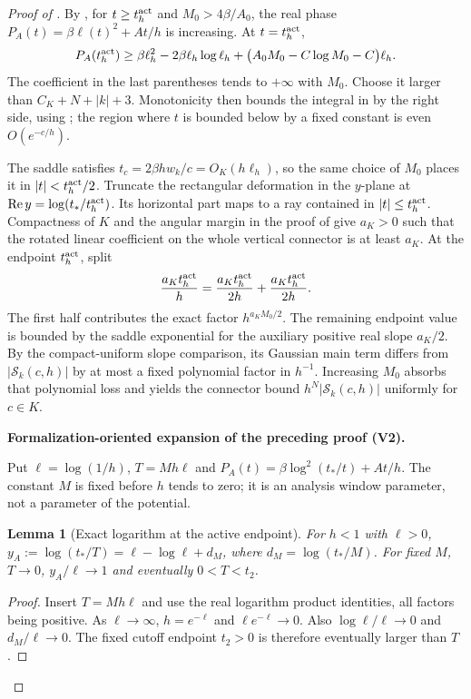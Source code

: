 \documentclass[11pt]{article}
\newtheorem{lemma}[theorem]{Lemma}
\newcommand{\formalisationparentid}{X}
\newenvironment{formalisationaddition}[1]{\par\medskip\begingroup\color{blue}\def\formalisationparentid{#1}\setcounter{formalizationsublemma}{0}\let\lemma\formalizationsublemma\let\endlemma\endformalizationsublemma
  \def\Eo{\mathcal E_h^\circ}\def\EE{\mathcal E_h}\def\phio{\phi_h^\circ}\def\phih{\phi_h}\def\Ho{H_h^{\rm atom}(v^\circ)}\def\Ha{H_h^{\rm atom}}\def\HL{H_h^{L}}\def\Dh{D_h}\def\Log{\operatorname{Log}}\def\ellh{\ell_h}\def\Gp{G_{p,h}}\def\Ast{A_{*,h}}\def\ahat{\widehat{\mathfrak a}_h}\def\ah{\mathfrak a_h}\def\rh{\widehat\rho_h}\def\deltah{\widehat\delta_h}\def\oldref##1{\textup{(##1)}}\def\interface##1{\par\noindent\textit{Analytical interface used here.} ##1\par}\def\finish{\par\noindent\textit{Conclusion of the formalization-oriented expansion.} }\par\noindent\textbf{Formalization-oriented expansion of the preceding proof (V2).}\par\smallskip
}{\par\endgroup\medskip
}
\newcommand{\Rea}{\operatorname{Re}}
\begin{document}
\begin{proof}[Proof of ]
By , for $t\ge t_h^{\rm act}$ and
$M_0>4\beta/A_0$, the real phase
$P_A(t)=\beta\ell(t)^2+At/h$ is increasing.  At $t=t_h^{\rm act}$,
\[
 P_A(t_h^{\rm act})
 \ge\beta\ell_h^2-2\beta\ell_h\log\ell_h
 +\bigl(A_0M_0-C\log M_0-C\bigr)\ell_h.
\]
The coefficient in the last parentheses tends to $+\infty$ with $M_0$.
Choose it larger than $C_K+N+|k|+3$.  Monotonicity then bounds the integral in
 by the right side, using
; the region where $t$ is bounded below by a fixed
constant is even $O(e^{-c/h})$.

The saddle satisfies
$t_c=2\beta h w_k/c=O_K(h\ell_h)$, so the same choice of $M_0$ places it in
$|t|<t_h^{\rm act}/2$.  Truncate the rectangular deformation in the $y$-plane at
$\Rea y=\log(t_*/t_h^{\rm act})$.  Its horizontal part maps to a ray contained in
$|t|\le t_h^{\rm act}$.  Compactness of $K$ and the angular margin in the proof of
 give $a_K>0$ such that the rotated
linear coefficient on the whole vertical connector is at least $a_K$.  At
the endpoint $t_h^{\rm act}$, split
\[
 \frac{a_Kt_h^{\rm act}}{h}
 =\frac{a_Kt_h^{\rm act}}{2h}+\frac{a_Kt_h^{\rm act}}{2h}.
\]
The first half contributes the exact factor $h^{a_KM_0/2}$.  The remaining
endpoint value is bounded by the saddle exponential for the auxiliary
positive real slope $a_K/2$.  By the compact-uniform slope comparison, its
Gaussian main term differs from $|\mathcal S_k(c,h)|$ by at most a fixed
polynomial factor in $h^{-1}$.  Increasing $M_0$ absorbs that polynomial loss
and yields the connector bound $h^N|\mathcal S_k(c,h)|$ uniformly for
$c\in K$.

\begin{formalisationaddition}{D-L6.6}
Put $\ell=\log(1/h)$, $T=Mh\ell$ and
$P_A(t)=\beta\log^2(t_*/t)+At/h$.
The constant $M$ is fixed before $h$ tends to zero; it is an analysis
window parameter, not a parameter of the potential.

\begin{lemma}[Exact logarithm at the active endpoint]\label{sublemma:D6-6-endpoint-log}
For $h<1$ with $\ell>0$,
$y_A:=\log(t_*/T)=\ell-\log\ell+d_M$,
where $d_M=\log(t_*/M)$.
For fixed $M$, $T\to0$, $y_A/\ell\to1$ and eventually $0<T<t_2$.
\end{lemma}
\begin{proof}
Insert $T=Mh\ell$ and use the real logarithm product identities, all
factors being positive. As $\ell\to\infty$, $h=e^{-\ell}$ and
$\ell e^{-\ell}\to0$. Also $\log\ell/\ell\to0$ and $d_M/\ell\to0$.
The fixed cutoff endpoint $t_2>0$ is therefore eventually larger than $T$.
\end{proof}


\end{formalisationaddition}
\end{proof}
\end{document}
